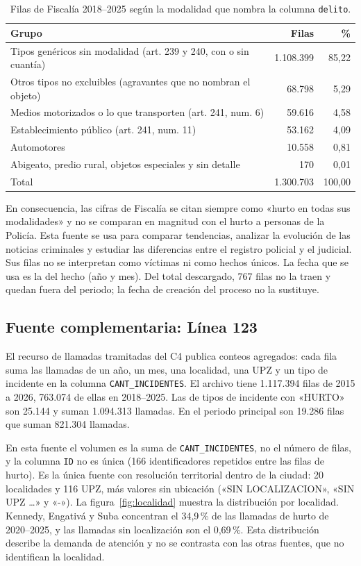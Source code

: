 \documentclass[12pt,letterpaper]{article}
\begin{document}
\begin{table}[H]
\centering
\small
\caption{Filas de Fiscalía 2018--2025 según la modalidad que nombra la columna \texttt{delito}.}\label{tab:fiscalia}
\begin{tabularx}{\textwidth}{@{}Xrr@{}}
\toprule
\textbf{Grupo} & \textbf{Filas} & \textbf{\%} \\
\midrule
Tipos genéricos sin modalidad (art. 239 y 240, con o sin cuantía) & 1.108.399 & 85,22 \\
Otros tipos no excluibles (agravantes que no nombran el objeto) & 68.798 & 5,29 \\
Medios motorizados o lo que transporten (art. 241, num. 6) & 59.616 & 4,58 \\
Establecimiento público (art. 241, num. 11) & 53.162 & 4,09 \\
Automotores & 10.558 & 0,81 \\
Abigeato, predio rural, objetos especiales y sin detalle & 170 & 0,01 \\
\midrule
Total & 1.300.703 & 100,00 \\
\bottomrule
\end{tabularx}
\end{table}

En consecuencia, las cifras de Fiscalía se citan siempre como «hurto en todas sus modalidades» y no se comparan en magnitud con el hurto a personas de la Policía. Esta fuente se usa para comparar tendencias, analizar la evolución de las noticias criminales y estudiar las diferencias entre el registro policial y el judicial. Sus filas no se interpretan como víctimas ni como hechos únicos. La fecha que se usa es la del hecho (año y mes). Del total descargado, 767 filas no la traen y quedan fuera del periodo; la fecha de creación del proceso no la sustituye.

\subsection{Fuente complementaria: Línea 123}

El recurso de llamadas tramitadas del C4 publica conteos agregados: cada fila suma las llamadas de un año, un mes, una localidad, una UPZ y un tipo de incidente en la columna \texttt{CANT\_INCIDENTES}. El archivo tiene 1.117.394 filas de 2015 a 2026, 763.074 de ellas en 2018--2025. Las de tipos de incidente con «HURTO» son 25.144 y suman 1.094.313 llamadas. En el periodo principal son 19.286 filas que suman 821.304 llamadas.

En esta fuente el volumen es la suma de \texttt{CANT\_INCIDENTES}, no el número de filas, y la columna \texttt{ID} no es única (166 identificadores repetidos entre las filas de hurto). Es la única fuente con resolución territorial dentro de la ciudad: 20 localidades y 116 UPZ, más valores sin ubicación («SIN LOCALIZACION», «SIN UPZ \ldots» y «-»). La figura~\ref{fig:localidad} muestra la distribución por localidad. Kennedy, Engativá y Suba concentran el 34,9\,\% de las llamadas de hurto de 2020--2025, y las llamadas sin localización son el 0,69\,\%. Esta distribución describe la demanda de atención y no se contrasta con las otras fuentes, que no identifican la localidad.
\end{document}

